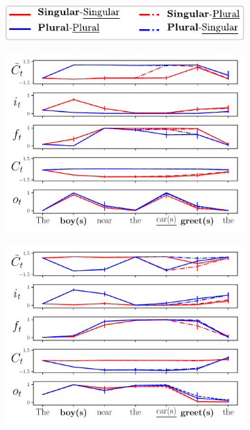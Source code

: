 \begin{figure}[ht]
    \centering
    \begin{subfigure}{\textwidth}
            \centering
            \includegraphics[width=0.4\linewidth]{Figures/legend.pdf}
    \end{subfigure}
    \bigskip
    \begin{subfigure}{0.45\textwidth}
            \centering
            \includegraphics[width=\linewidth]{Figures/nounpp_987.pdf}
    \label{fig:singular-unit}
    \end{subfigure}
    \begin{subfigure}{0.45\textwidth}
            \centering
            \includegraphics[width=\linewidth]{Figures/nounpp_775.pdf}

\end{subfigure}
\end{figure}
